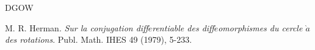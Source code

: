 \documentclass{amsart}
\begin{document}
\begin{thebibliography}{DGOW}
			
			
			
			
			
			
			
			
			
			
			
			 M. R. Herman. {\it Sur la conjugation diff$\acute{e}$rentiable des diff$\acute{e}$omorphismes du cercle $\grave{a}$ des rotations}. Publ. Math. IHES {49} (1979), 5-233.
			

\end{thebibliography}
\end{document}
